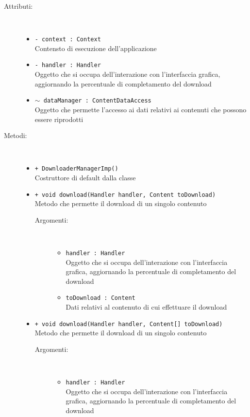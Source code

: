 \documentclass[../Tesi.tex]{subfiles}
\begin{document}
		\begin{description}
			\item[Attributi:] \
			\begin{itemize}
				\item \texttt{- context : Context}\\
				Contensto di esecuzione dell'applicazione

				\item \texttt{- handler : Handler}\\
				Oggetto che si occupa dell'interazione con l'interfaccia grafica, aggiornando la percentuale di completamento del download

				\item \texttt{$\sim$ dataManager : ContentDataAccess}\\
				Oggetto che permette l'accesso ai dati relativi ai contenuti che possono essere riprodotti
			\end{itemize}

			\item[Metodi:] \
			\begin{itemize}
				\item \texttt{+ DownloaderManagerImp()}\\
				Costruttore di default dalla classe 

				\item \texttt{+ void download(Handler handler, Content toDownload)}\\
				Metodo che permette il download di un singolo contenuto
				\begin{description}
					\item[Argomenti:] \
					\begin{itemize}
						\item \texttt{handler : Handler}\\
						Oggetto che si occupa dell'interazione con l'interfaccia grafica, aggiornando la percentuale di completamento del download

						\item \texttt{toDownload : Content}\\
						Dati relativi al contenuto di cui effettuare il download						
					\end{itemize}
				\end{description}

				\item \texttt{+ void download(Handler handler, Content[] toDownload)}\\
				Metodo che permette il download di un singolo contenuto
				\begin{description}
					\item[Argomenti:] \
					\begin{itemize}
						\item \texttt{handler : Handler}\\
						Oggetto che si occupa dell'interazione con l'interfaccia grafica, aggiornando la percentuale di completamento del download


\end{itemize}
\end{description}
\end{itemize}
\end{description}
\end{document}
